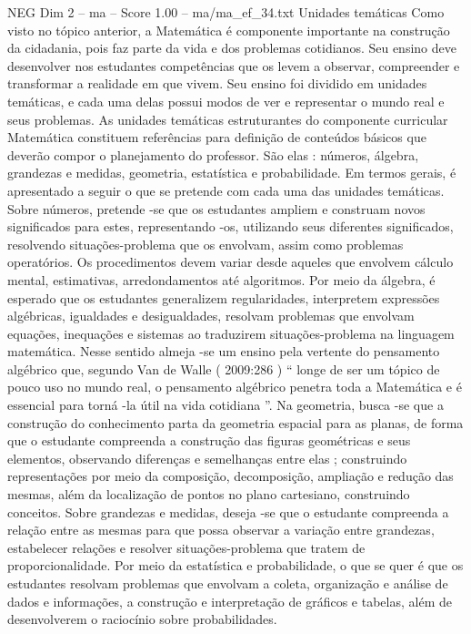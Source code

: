 \begin{textsample}{NEG Dim 2 – ma – Score 1.00 – ma/ma\_ef\_34.txt}  \label{ex:f2_neg_239}
Unidades temáticas Como visto no tópico anterior, a Matemática é componente importante na construção da cidadania, pois faz parte da vida e dos problemas cotidianos.
Seu ensino deve desenvolver nos estudantes competências que os levem a observar, compreender e transformar a realidade em que vivem.
Seu ensino foi dividido em unidades temáticas, e cada uma delas possui modos de ver e representar o mundo real e seus problemas.
As unidades temáticas estruturantes do componente curricular Matemática constituem referências para definição de conteúdos básicos que deverão compor o planejamento do professor.
São elas : números, álgebra, grandezas e medidas, geometria, estatística e probabilidade.
Em termos gerais, é apresentado a seguir o que se pretende com cada uma das unidades temáticas.
Sobre números, pretende -se que os estudantes ampliem e construam novos significados para estes, representando -os, utilizando seus diferentes significados, resolvendo situações-problema que os envolvam, assim como problemas operatórios.
Os procedimentos devem variar desde aqueles que envolvem cálculo mental, estimativas, arredondamentos até algoritmos.
Por meio da álgebra, é esperado que os estudantes generalizem regularidades, interpretem expressões algébricas, igualdades e desigualdades, resolvam problemas que envolvam equações, inequações e sistemas ao traduzirem situações-problema na linguagem matemática.
Nesse sentido almeja -se um ensino pela vertente do pensamento algébrico que, segundo Van de Walle ( 2009:286 ) “ longe de ser um tópico de pouco uso no mundo real, o pensamento algébrico penetra toda a Matemática e é essencial para torná -la útil na vida cotidiana ”.
Na geometria, busca -se que a construção do conhecimento parta da geometria espacial para as planas, de forma que o estudante compreenda a construção das figuras geométricas e seus elementos, observando diferenças e semelhanças entre elas ; construindo representações por meio da composição, decomposição, ampliação e redução das mesmas, além da localização de pontos no plano cartesiano, construindo conceitos.
Sobre grandezas e medidas, deseja -se que o estudante compreenda a relação entre as mesmas para que possa observar a variação entre grandezas, estabelecer relações e resolver situações-problema que tratem de proporcionalidade.
Por meio da estatística e probabilidade, o que se quer é que os estudantes resolvam problemas que envolvam a coleta, organização e análise de dados e informações, a construção e interpretação de gráficos e tabelas, além de desenvolverem o raciocínio sobre probabilidades.

\end{textsample}
